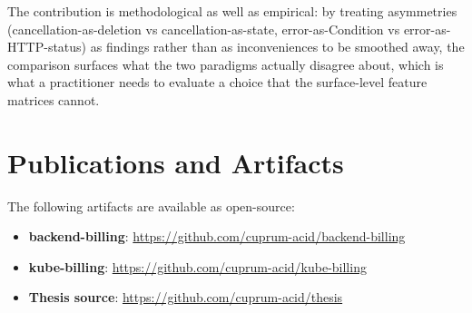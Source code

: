 The contribution is methodological as well as empirical: by treating asymmetries (cancellation-as-deletion vs cancellation-as-state, error-as-Condition vs error-as-HTTP-status) as findings rather than as inconveniences to be smoothed away, the comparison surfaces what the two paradigms actually disagree about, which is what a practitioner needs to evaluate a choice that the surface-level feature matrices cannot.

\section{Publications and Artifacts}

The following artifacts are available as open-source:

\begin{itemize}
    \item \textbf{backend-billing}: \url{https://github.com/cuprum-acid/backend-billing}
    \item \textbf{kube-billing}: \url{https://github.com/cuprum-acid/kube-billing}
    \item \textbf{Thesis source}: \url{https://github.com/cuprum-acid/thesis}
\end{itemize}
